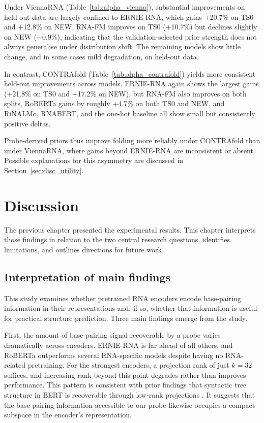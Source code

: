 \documentclass[logo,bsc,singlespacing,parskip]{infthesis}
\begin{document}
Under ViennaRNA (Table~\ref{tab:alpha_vienna}), substantial improvements on held-out data are largely confined to ERNIE-RNA, which gains +20.7\% on TS0 and +12.8\% on NEW. RNA-FM improves on TS0 (+10.7\%) but declines slightly on NEW ($-0.9\%$), indicating that the validation-selected prior strength does not always generalise under distribution shift. The remaining models show little change, and in some cases mild degradation, on held-out data. 

In contrast, CONTRAfold (Table~\ref{tab:alpha_contrafold}) yields more consistent held-out improvements across models.
ERNIE-RNA again shows the largest gains (+21.8\% on TS0 and +17.2\% on NEW), but RNA-FM also improves on both splits, RoBERTa gains by roughly +4.7\% on both TS0 and NEW, and RiNALMo, RNABERT, and the one-hot baseline all show small but consistently positive deltas.

Probe-derived priors thus improve folding more reliably under CONTRAfold than under ViennaRNA, where gains beyond ERNIE-RNA are inconsistent or absent. Possible explanations for this asymmetry
are discussed in Section~\ref{sec:disc_utility}.

\chapter{Discussion}
\label{ch:discussion}
The previous chapter presented the experimental results. This chapter interprets those findings in relation to the two central research questions, identifies limitations, and outlines directions for future work.

\section{Interpretation of main findings}
This study examines whether pretrained RNA encoders encode base-pairing information in their representations and, if so, whether that information is useful for practical structure prediction. Three main findings emerge from the study. 

First, the amount of base-pairing signal recoverable by a probe varies dramatically across encoders. ERNIE-RNA is far ahead of all others, and RoBERTa outperforms several RNA-specific models despite having no RNA-related pretraining. For the strongest encoders, a projection rank of just $k{=}32$ suffices, and increasing rank beyond this point degrades rather than improves performance. This pattern is consistent with prior findings that syntactic tree structure in BERT is recoverable through low-rank projections \citep{hewitt2019structural}. It suggests that the base-pairing information accessible to our probe likewise occupies a compact subspace in the encoder's representation.
\end{document}
